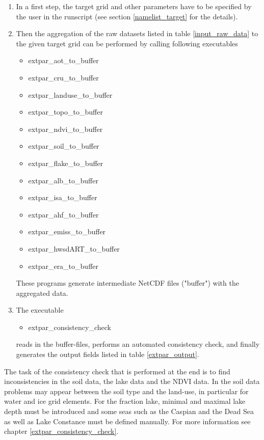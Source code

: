 \documentclass[a4paper,10pt,DIV14,BCOR1cm,titlepage,twoside]{scrartcl}
\begin{document}
\begin{enumerate}
\item In a first step, the target grid and other parameters have to be specified by the user in the runscript (see section \ref{namelist_target} for the details).
\item Then the aggregation of the raw datasets listed in table \ref{input_raw_data} to the given target grid can be performed by calling following executables
  \begin{itemize}
     \item extpar\_aot\_to\_buffer
     \item extpar\_cru\_to\_buffer
     \item extpar\_landuse\_to\_buffer
     \item extpar\_topo\_to\_buffer
     \item extpar\_ndvi\_to\_buffer
     \item extpar\_soil\_to\_buffer
     \item extpar\_flake\_to\_buffer
     \item extpar\_alb\_to\_buffer
     \item extpar\_isa\_to\_buffer
     \item extpar\_ahf\_to\_buffer
     \item extpar\_emiss\_to\_buffer
     \item extpar\_hwsdART\_to\_buffer  
     \item extpar\_era\_to\_buffer
  \end{itemize}

These programs generate intermediate NetCDF files ("buffer") with the aggregated data.
\item The executable 
\begin{itemize}
     \item extpar\_consistency\_check    
  \end{itemize}
reads in the buffer-files, performs an automated consistency check, and finally generates the output fields listed in table \ref{extpar_output}.
\end{enumerate}

The task of the consistency check that is performed at the end is to find inconsistencies in the soil data, the lake data and the NDVI data. In the soil data problems may appear between the soil type and the land-use, in particular for water and ice grid elements. For the fraction lake, minimal and maximal lake depth must be introduced and some seas such as the Caspian and the Dead Sea as well as Lake Constance must be defined manually. For more information see chapter \ref{extpar_consistency_check}.\par\medskip\noindent
\end{document}
